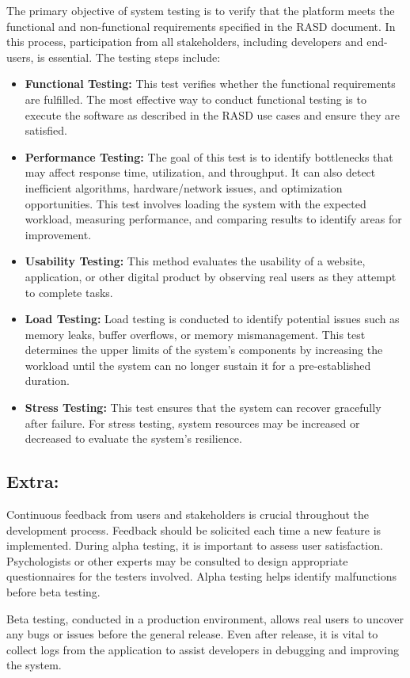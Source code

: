 The primary objective of system testing is to verify that the platform meets the functional and non-functional requirements specified in the RASD document. In this process, participation from all stakeholders, including developers and end-users, is essential. The testing steps include:

\begin{itemize}
    \item \textbf{Functional Testing:} This test verifies whether the functional requirements are fulfilled. The most effective way to conduct functional testing is to execute the software as described in the RASD use cases and ensure they are satisfied.

    \item \textbf{Performance Testing:} The goal of this test is to identify bottlenecks that may affect response time, utilization, and throughput. It can also detect inefficient algorithms, hardware/network issues, and optimization opportunities. This test involves loading the system with the expected workload, measuring performance, and comparing results to identify areas for improvement.

    \item \textbf{Usability Testing:} This method evaluates the usability of a website, application, or other digital product by observing real users as they attempt to complete tasks.

    \item \textbf{Load Testing:} Load testing is conducted to identify potential issues such as memory leaks, buffer overflows, or memory mismanagement. This test determines the upper limits of the system's components by increasing the workload until the system can no longer sustain it for a pre-established duration.

    \item \textbf{Stress Testing:} This test ensures that the system can recover gracefully after failure. For stress testing, system resources may be increased or decreased to evaluate the system's resilience.
\end{itemize}

\subsection{Extra:}

Continuous feedback from users and stakeholders is crucial throughout the development process. Feedback should be solicited each time a new feature is implemented. During alpha testing, it is important to assess user satisfaction. Psychologists or other experts may be consulted to design appropriate questionnaires for the testers involved. Alpha testing helps identify malfunctions before beta testing.

Beta testing, conducted in a production environment, allows real users to uncover any bugs or issues before the general release. Even after release, it is vital to collect logs from the application to assist developers in debugging and improving the system.
